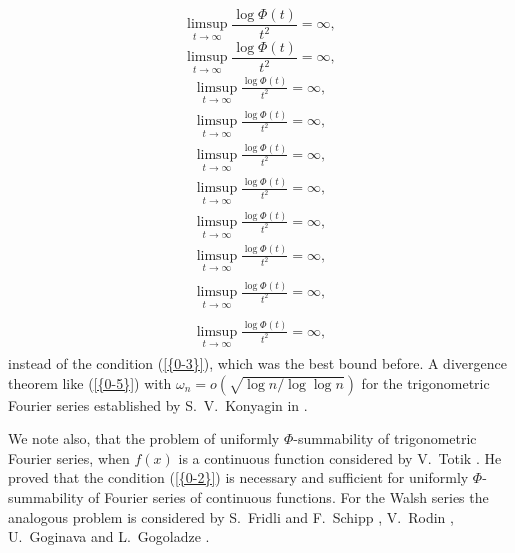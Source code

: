 \documentclass{amsart}
\numberwithin{equation}{section}
\begin{document}
{
\begin{equation*} 
\limsup_{t\to\infty}\frac{\log\Phi(t)}{t^2}=\infty,
 \end{equation*}\fi  
{}\begin{equation}
\limsup_{t\to\infty}\frac{\log\Phi(t)}{t^2}=\infty,
\end{equation}\fi   
{}\begin{align*}
\limsup_{t\to\infty}\frac{\log\Phi(t)}{t^2}=\infty,
\end{align*}\fi   
{}\begin{align}
\limsup_{t\to\infty}\frac{\log\Phi(t)}{t^2}=\infty,
\end{align}\fi    
{}\begin{gather*}
\limsup_{t\to\infty}\frac{\log\Phi(t)}{t^2}=\infty,
\end{gather*}\fi  
{}\begin{gather}
\limsup_{t\to\infty}\frac{\log\Phi(t)}{t^2}=\infty,
\end{gather}\fi   
{}\begin{multline*}
\limsup_{t\to\infty}\frac{\log\Phi(t)}{t^2}=\infty,
\end{multline*}\fi  
{}\begin{multline}
\limsup_{t\to\infty}\frac{\log\Phi(t)}{t^2}=\infty,
\end{multline}\fi  
{}\begin{multline*}\begin{split}
\limsup_{t\to\infty}\frac{\log\Phi(t)}{t^2}=\infty,
\end{split}\end{multline*}\fi
{}\begin{multline}\begin{split}
\limsup_{t\to\infty}\frac{\log\Phi(t)}{t^2}=\infty,
\end{split}\end{multline}\fi
}
instead of the condition {(\ref{{0-3}})}, which was the best bound before. A divergence theorem like {(\ref{{0-5}})} with $\omega_n=o(\sqrt {\log n/\log\log n })$ for the trigonometric Fourier series established by S.~V.~Konyagin in \cite{Kon}.

We note also, that the problem of uniformly $\Phi$-summability of trigonometric Fourier series, when $f(x)$ is a continuous function considered by V.~Totik \cite{Tot1, Tot2}. He proved that the condition {(\ref{{0-2}})} is necessary and sufficient for uniformly  $\Phi$-summability of Fourier series of continuous functions. For the Walsh series the analogous problem is considered by S.~Fridli and F.~Schipp \cite{FrSc1,FrSc2}, V.~Rodin \cite{Rod2},  U.~Goginava and L.~Gogoladze \cite{GoGo}.
\end{document}

